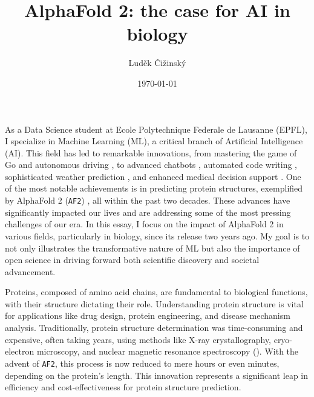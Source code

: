 \documentclass[12pt]{article}
\title{
    \vspace{-2cm} AlphaFold 2: the case for AI in biology
}
\author{
    \vspace{0.1cm} Luděk Čižinský
}
\date{\today}
\begin{document}
\maketitle

As a Data Science student at Ecole Polytechnique Federale de Lausanne (EPFL), I specialize in Machine Learning (ML), a critical branch of Artificial Intelligence (AI). This field has led to remarkable innovations, from mastering the game of Go \cite{alphago} and autonomous driving \cite{darpa}, to advanced chatbots \cite{gpt3}, automated code writing \cite{codex}, sophisticated weather prediction \cite{graphcast}, and enhanced medical decision support \cite{medpalm2}. One of the most notable achievements is in predicting protein structures, exemplified by AlphaFold 2 (\texttt{AF2}) \cite{alphafold2}, all within the past two decades. These advances have significantly impacted our lives and are addressing some of the most pressing challenges of our era. In this essay, I focus on the impact of AlphaFold 2 in various fields, particularly in biology, since its release two years ago. My goal is to not only illustrates the transformative nature of ML but also the importance of open science in driving forward both scientific discovery and societal advancement.


Proteins, composed of amino acid chains, are fundamental to biological functions, with their structure dictating their role. Understanding protein structure is vital for applications like drug design, protein engineering, and disease mechanism analysis. Traditionally, protein structure determination was time-consuming and expensive, often taking years, using methods like X-ray crystallography, cryo-electron microscopy, and nuclear magnetic resonance spectroscopy (\cite{forbes-af2}). With the advent of \texttt{AF2}, this process is now reduced to mere hours or even minutes, depending on the protein's length. This innovation represents a significant leap in efficiency and cost-effectiveness for protein structure prediction.




\newpage


\end{document}
